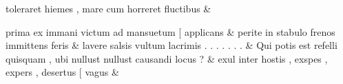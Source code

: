 \documentclass[12pt,onecolumn,twoside,a4paper]{memoir}
\begin{document}
\begin{pairs}
\begin{Leftside}
                              toleraret
                              hiemes
                              ,
                              mare
                              cum
                              horreret
                              fluctibus \&
                         \stanza {}
                     
                              prima
                              ex
                              immani
                              victum
                              ad
                              mansuetum
                              [
                              applicans \&
                         \stanza {}
                     perite
                              in
                              stabulo
                              frenos
                              immittens
                              feris \&
                         \stanza {}
                     lavere
                              salsis
                              vultum
                              lacrimis
                              .
                              .
                              .
                              .
                              .
                              .
                              . \&
                         \stanza {}
                     Qui
                              potis
                              est
                              refelli
                              quisquam
                              ,
                              ubi
                              nullust
                              {nullust}
                              causandi
                              locus
                              ? \&
                         \stanza {}
                     exul
                              inter
                              hostis
                              ,
                              exspes
                              ,
                              expers
                              ,
                              desertus
                              [
                              vagus \&
                         \stanza {}
                     

\end{Leftside}
\end{pairs}
\end{document}
